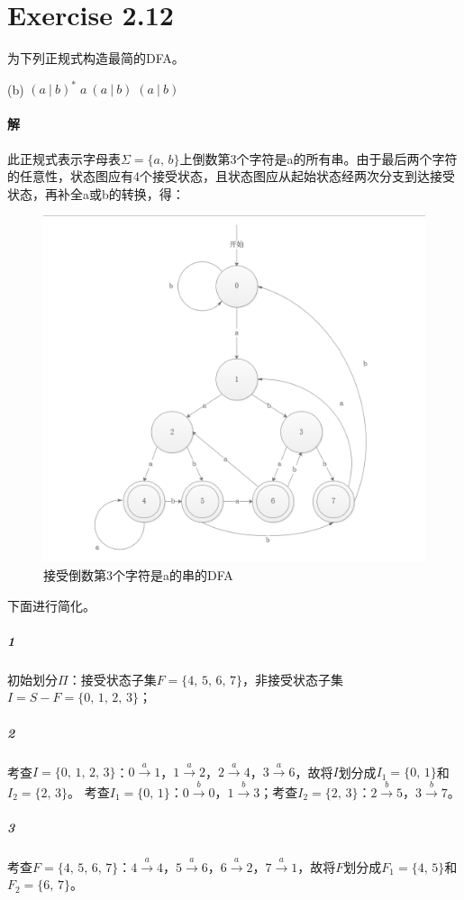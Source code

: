 \documentclass{article}
\begin{document}
\section{Exercise 2.12}
为下列正规式构造最简的DFA。\par
(b) $(a\ |\ b)^*\;a\ (a\ |\ b)\;(a\ |\ b)$
\\

\paragraph{解}
此正规式表示字母表$\Sigma=\{a,\,b\}$上倒数第3个字符是a的所有串。由于最后两个字符的任意性，状态图应有4个接受状态，且状态图应从起始状态经两次分支到达接受状态，再补全a或b的转换，得：\par
\begin{figure}
\centering
\includegraphics[scale=0.7]{DFA2.png}
\caption{接受倒数第3个字符是a的串的DFA}
\label{fig:2}
\end{figure}
下面进行简化。
\subparagraph{1}
初始划分$\Pi$：接受状态子集$F=\{4,\,5,\,6,\,7\}$，非接受状态子集$I=S-F=\{0,\,1,\,2,\,3\}$；
\subparagraph{2}
考查$I=\{0,\,1,\,2,\,3\}$：$0 \xrightarrow{a} 1$，$1 \xrightarrow{a} 2$，$2 \xrightarrow{a} 4$，$3 \xrightarrow{a} 6$，故将$I$划分成$I_1=\{0,\,1\}$和$I_2=\{2,\,3\}$。
考查$I_1=\{0,\,1\}$：$0 \xrightarrow{b} 0$，$1 \xrightarrow{b} 3$；考查$I_2=\{2,\,3\}$：$2 \xrightarrow{b} 5$，$3 \xrightarrow{b} 7$。
\subparagraph{3}
考查$F=\{4,\,5,\,6,\,7\}$：$4 \xrightarrow{a} 4$，$5 \xrightarrow{a} 6$，$6  \xrightarrow{a} 2$，$7 \xrightarrow{a} 1$，故将$F$划分成$F_1=\{4,\,5\}$和$F_2=\{6,\,7\}$。
\end{document}
